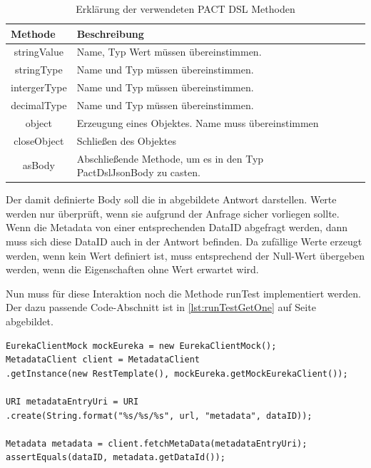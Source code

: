 \documentclass{llncs}
\begin{document}
\begin{table}[htbp]
\centering
\begin{tabular}{|c|l|p{4cm}|p{4cm}|}
\hline
\multicolumn{1}{|l|}{Methode} & Beschreibung \\ \hline
stringValue & Name, Typ Wert müssen übereinstimmen. \\ \hline
stringType & Name und Typ müssen übereinstimmen. \\ \hline
intergerType & Name und Typ müssen übereinstimmen. \\ \hline
decimalType & Name und Typ müssen übereinstimmen. \\ \hline
object & Erzeugung eines Objektes. Name muss übereinstimmen  \\ \hline
closeObject & Schließen des Objektes\\ \hline
asBody & Abschließende Methode, um es in den Typ PactDslJsonBody zu casten. \\ \hline
\end{tabular}
\caption{Erklärung der verwendeten PACT DSL Methoden}
\label{tab:Methoden_jsonBody}
\end{table}

Der damit definierte Body soll die in abgebildete Antwort darstellen. Werte werden nur überprüft, wenn sie aufgrund der Anfrage sicher vorliegen sollte. Wenn die Metadata von einer entsprechenden DataID abgefragt werden, dann muss sich diese DataID auch in der Antwort befinden. Da zufällige Werte erzeugt werden, wenn kein Wert definiert ist, muss entsprechend der Null-Wert übergeben werden, wenn die Eigenschaften ohne Wert erwartet wird.

Nun muss für diese Interaktion noch die Methode runTest implementiert werden. Der dazu passende Code-Abschnitt ist in \ref{lst:runTestGetOne} auf Seite \pageref{lst:runTestGetOne} abgebildet.

\lstset{language = Java}
\begin{lstlisting}[caption=Test,label={lst:runTestGetOne}]
EurekaClientMock mockEureka = new EurekaClientMock();
MetadataClient client = MetadataClient
.getInstance(new RestTemplate(), mockEureka.getMockEurekaClient());

URI metadataEntryUri = URI
.create(String.format("%s/%s/%s", url, "metadata", dataID));

Metadata metadata = client.fetchMetaData(metadataEntryUri);
assertEquals(dataID, metadata.getDataId());

\end{lstlisting}
 
\end{document}
